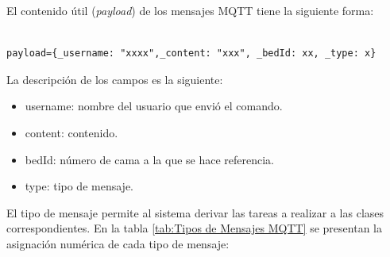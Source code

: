 El contenido útil (\textit{payload}) de los mensajes MQTT tiene la siguiente forma:

\begin{lstlisting}[label=cod:Mensaje MQTT,caption=  Formato mensaje MQTT.]

payload={_username: "xxxx",_content: "xxx", _bedId: xx, _type: x}

\end{lstlisting}

La descripción de los campos es la siguiente:
\begin{itemize}
\item \textunderscore username: nombre del usuario que envió el comando.
\item \textunderscore content: contenido.
\item \textunderscore bedId: número de cama a la que se hace referencia.
\item \textunderscore type: tipo de mensaje.
\end{itemize}

El tipo de mensaje permite al sistema derivar las tareas a realizar a las clases correspondientes. En la tabla \ref{tab:Tipos de Mensajes MQTT} se presentan la asignación numérica de cada tipo de mensaje:

